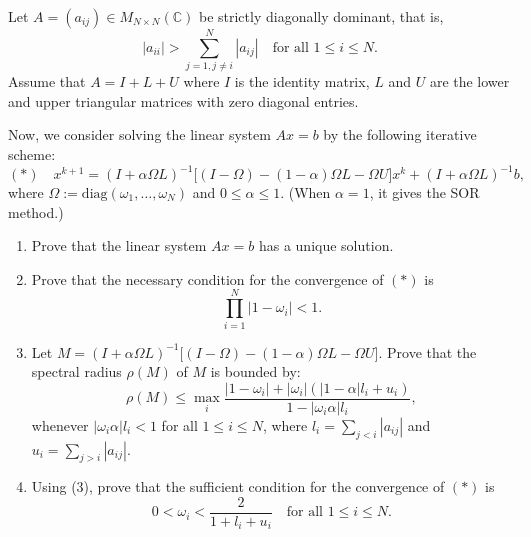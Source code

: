 \begin{exercise}
\label{applied:2012:7}
Let $A=(a_{ij})\in M_{N\times N}(\mathbb{C})$ be strictly diagonally dominant, that is,
\[
|a_{ii}|>\sum_{j=1,j\neq i}^{N}|a_{ij}|\quad\text{for all }1\leq i\leq N.
\]
Assume that $A=I+L+U$ where $I$ is the identity matrix, $L$ and $U$ are the lower and upper triangular matrices with zero diagonal entries.

Now, we consider solving the linear system $Ax=b$ by the following iterative scheme:
\[
(*)\quad x^{k+1}=(I+\alpha\Omega L)^{-1}\big[(I-\Omega)-(1-\alpha)\Omega L-\Omega U\big]x^{k}+(I+\alpha\Omega L)^{-1}b,
\]
where $\Omega:=\mathrm{diag}(\omega_{1},\ldots,\omega_{N})$ and $0\leq\alpha\leq1$. (When $\alpha=1$, it gives the SOR method.)
\begin{enumerate}
    \item[(1)] Prove that the linear system $Ax=b$ has a unique solution.
    \item[(2)] Prove that the necessary condition for the convergence of $(*)$ is
    \[
    \prod_{i=1}^{N}|1-\omega_{i}|<1.
    \]
    \item[(3)] Let $M=(I+\alpha\Omega L)^{-1}\big[(I-\Omega)-(1-\alpha)\Omega L-\Omega U\big]$. Prove that the spectral radius $\rho(M)$ of $M$ is bounded by:
    \[
    \rho(M)\leq\max_{i}\frac{|1-\omega_{i}|+|\omega_{i}|(|1-\alpha|l_{i}+u_{i})}{1-|\omega_{i}\alpha|l_{i}},
    \]
    whenever $|\omega_{i}\alpha|l_{i}<1$ for all $1\leq i\leq N$, where $l_{i}=\sum_{j<i}|a_{ij}|$ and $u_{i}=\sum_{j>i}|a_{ij}|$.
    \item[(4)] Using (3), prove that the sufficient condition for the convergence of $(*)$ is
    \[
    0<\omega_{i}<\frac{2}{1+l_{i}+u_{i}}\quad\text{for all }1\leq i\leq N.
    \]
\end{enumerate}
\end{exercise}

